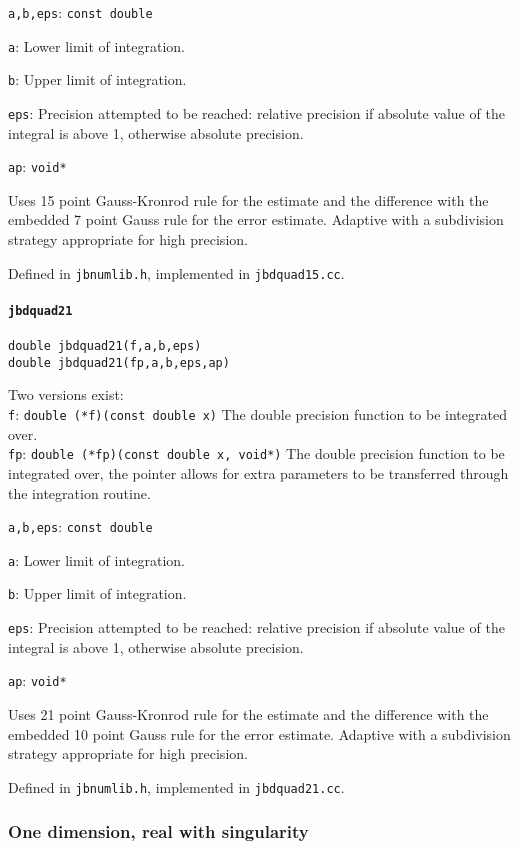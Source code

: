 \documentclass[12pt,a4paper]{article}
\newcommand{\mytt}[1]{\texttt{#1}}
\newcommand{\newfunction}[1]{\mytt{#1}\index{\mytt{#1}}}
\begin{document}
\mytt{a,b,eps}: \mytt{const double}

\mytt{a}: Lower limit of integration.

\mytt{b}: Upper limit of integration.

\mytt{eps}: Precision attempted to be reached: relative precision if absolute
value of the integral is above 1, otherwise absolute precision.

\mytt{ap}: \mytt{void*}

Uses 15 point Gauss-Kronrod rule for the estimate
and the difference with the embedded 7 point Gauss rule for
the error estimate. Adaptive with a subdivision strategy
appropriate for high precision.

Defined in \mytt{jbnumlib.h}, implemented in \mytt{jbdquad15.cc}.

\paragraph{\newfunction{jbdquad21}}

\mytt{double jbdquad21(f,a,b,eps)}\\
\mytt{double jbdquad21(fp,a,b,eps,ap)}

Two versions exist:\\
\mytt{f}: \mytt{double (*f)(const double x)} The double precision
function to be integrated over.\\
\mytt{fp}: \mytt{double (*fp)(const double x, void*)} The double precision
function to be integrated over, the pointer allows for extra parameters
to be transferred through the integration routine.

\mytt{a,b,eps}: \mytt{const double}

\mytt{a}: Lower limit of integration.

\mytt{b}: Upper limit of integration.

\mytt{eps}: Precision attempted to be reached: relative precision if absolute
value of the integral is above 1, otherwise absolute precision.

\mytt{ap}: \mytt{void*}

Uses 21 point Gauss-Kronrod rule for the estimate
and the difference with the embedded 10 point Gauss rule for
the error estimate. Adaptive with a subdivision strategy
appropriate for high precision.

Defined in \mytt{jbnumlib.h}, implemented in \mytt{jbdquad21.cc}.


\subsubsection{One dimension, real with singularity}
\end{document}
